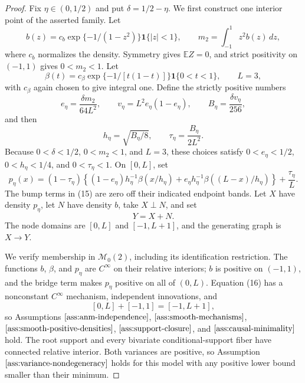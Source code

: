 \documentclass{article}
\begin{document}
\begin{proof}
Fix \(\eta\in(0,1/2)\) and put \(\delta=1/2-\eta\).  We first construct one interior point of the asserted family.  Let
\[
 b(z)=c_b\exp\{-1/(1-z^2)\}\mathbf 1\{|z|<1\},
 \qquad m_2=\int_{-1}^1z^2b(z)\,dz,
\]
where \(c_b\) normalizes the density.  Symmetry gives \(\mathbb E Z=0\), and strict positivity on \((-1,1)\) gives \(0<m_2<1\).  Let
\[
 \beta(t)=c_\beta\exp\{-1/[t(1-t)]\}\mathbf 1\{0<t<1\},
 \qquad L=3,
\]
with \(c_\beta\) again chosen to give integral one.  Define the strictly positive numbers
\[
 e_\eta=\frac{\delta m_2}{64L^2},\qquad
 v_\eta=L^2e_\eta(1-e_\eta),\qquad
 B_\eta=\frac{\delta v_\eta}{256},
\]
and then
\[
 h_\eta=\sqrt{B_\eta/8},
 \qquad \tau_\eta=\frac{B_\eta}{2L^2}.
\]
Because \(0<\delta<1/2\), \(0<m_2<1\), and \(L=3\), these choices satisfy \(0<e_\eta<1/2\), \(0<h_\eta<1/4\), and \(0<\tau_\eta<1\).  On \([0,L]\), set
\[
 p_\eta(x)=(1-\tau_\eta)
 \left\{(1-e_\eta)h_\eta^{-1}\beta(x/h_\eta)
 +e_\eta h_\eta^{-1}\beta((L-x)/h_\eta)\right\}
 +\frac{\tau_\eta}{L}. \tag{15}
\]
The bump terms in (15) are zero off their indicated endpoint bands.  Let \(X\) have density \(p_\eta\), let \(N\) have density \(b\), take \(X\perp N\), and set
\[
 Y=X+N. \tag{16}
\]
The node domains are \([0,L]\) and \([-1,L+1]\), and the generating graph is \(X\to Y\).

We verify membership in \(\mathcal M_0(2)\), including its identification restriction.  The functions \(b\), \(\beta\), and \(p_\eta\) are \(C^\infty\) on their relative interiors; \(b\) is positive on \((-1,1)\), and the bridge term makes \(p_\eta\) positive on all of \((0,L)\).  Equation (16) has a nonconstant \(C^\infty\) mechanism, independent innovations, and
\[
 [0,L]+[-1,1]=[-1,L+1],
\]
so Assumptions \(\ref{ass:anm-independence}\), \(\ref{ass:smooth-mechanisms}\), \(\ref{ass:smooth-positive-densities}\), \(\ref{ass:support-closure}\), and \(\ref{ass:causal-minimality}\) hold.  The root support and every bivariate conditional-support fiber have connected relative interior.  Both variances are positive, so Assumption \(\ref{ass:variance-nondegeneracy}\) holds for this model with any positive lower bound smaller than their minimum.


\end{proof}
\end{document}
